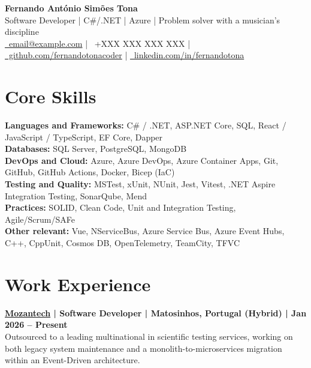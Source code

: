 \documentclass[a4paper,10pt]{article}
\begin{document}
\begin{center}
  {\Large \textbf{Fernando António Simões Tona}}\\[4pt]
  Software Developer | C\#/.NET | Azure | Problem solver with a musician’s discipline\\[4pt]
  {\small
  \href{mailto:email@example.com}{\faEnvelope\ email@example.com} | \faMobile\ +XXX XXX XXX XXX | \href{https://github.com/fernandotonacoder}{\faGithub\ github.com/fernandotonacoder} | \href{https://www.linkedin.com/in/fernandotona/}{\faLinkedin\ linkedin.com/in/fernandotona}
   }
\end{center}

\section{Core Skills}
\vspace{2pt}
{\small
\textbf{Languages and Frameworks:} C\# / .NET, ASP.NET Core, SQL, React / JavaScript / TypeScript, EF Core, Dapper\\[2pt]
\textbf{Databases:} SQL Server, PostgreSQL, MongoDB\\[2pt]
\textbf{DevOps and Cloud:} Azure, Azure DevOps, Azure Container Apps, Git, GitHub, GitHub Actions, Docker, Bicep (IaC)\\[2pt]
\textbf{Testing and Quality:} MSTest, xUnit, NUnit, Jest, Vitest, .NET Aspire Integration Testing, SonarQube, Mend\\[2pt]
\textbf{Practices:} SOLID, Clean Code, Unit and Integration Testing, Agile/Scrum/SAFe\\[2pt]
\textbf{Other relevant:} Vue, NServiceBus, Azure Service Bus, Azure Event Hubs, C++, CppUnit, Cosmos DB, OpenTelemetry, TeamCity, TFVC
}

\section{Work Experience}
\begin{tcolorbox}[jobbox]
\textbf{\href{https://mozantech.com/}{Mozantech} | Software Developer | Matosinhos, Portugal (Hybrid) | Jan 2026 -- Present}\\
{\small
Outsourced to a leading multinational in scientific testing services, working on both legacy system maintenance and a monolith-to-microservices migration within an Event-Driven architecture.
}
\end{tcolorbox}
\end{document}
